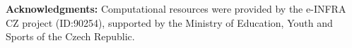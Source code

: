 

\def\bibfont{\hfuzz=2pt}

\printbibliography[heading=bibintoc]
\vspace{1em}
\noindent \textbf{Acknowledgments:} Computational resources were provided by the e-INFRA CZ project (ID:90254), supported by the Ministry of Education, Youth and Sports of the Czech Republic.




